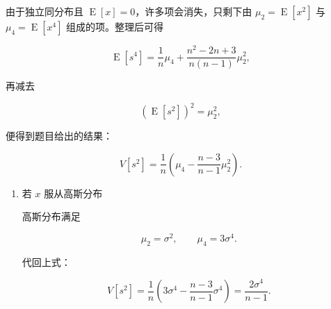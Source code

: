 \begin{question}
\begin{solution}
由于独立同分布且 \(\operatorname{E}[x]=0\)，许多项会消失，只剩下由 \(\mu_2=\operatorname{E}[x^2]\) 与
\(\mu_4=\operatorname{E}[x^4]\) 组成的项。整理后可得

\[
\operatorname{E}[s^4]=\frac1n\mu_4+
\frac{n^2-2n+3}{n(n-1)}\mu_2^2,
\]

再减去

\[
(\operatorname{E}[s^2])^2=\mu_2^2,
\]

便得到题目给出的结果：

\[
V[s^2]=\frac1n\left(\mu_4-\frac{n-3}{n-1}\mu_2^2\right).
\]

\begin{enumerate}[start=2]
\item 若 \(x\) 服从高斯分布

高斯分布满足

\[
\mu_2=\sigma^2,\qquad \mu_4=3\sigma^4.
\]

代回上式：

\[
V[s^2]
=\frac1n\left(3\sigma^4-\frac{n-3}{n-1}\sigma^4\right)
=\frac{2\sigma^4}{n-1}.
\]
\end{enumerate}
\end{solution}
\end{question}

